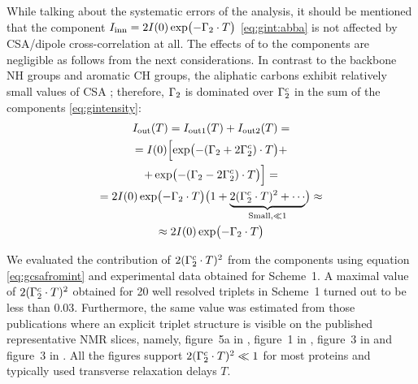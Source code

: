 \documentclass[twocolumn]{svjour3}           %
\begin{document}
While talking about the systematic errors of the analysis, it should be
mentioned that the \qinner{} component 
$I_\textrm{inn}{} = 2I(0)\exp \bigl( -{\Gamma_2 \cdot T\bigr)}$ \eqref{eq:gint:abba} 
is not affected by CSA\slash dipole cross-cor\-re\-la\-tion \gtwoCSA{} 
at all. The effects of \gtwoCSA{} to the \qouter{} components are negligible as follows from the next considerations. 
In contrast to the backbone NH groups and aromatic CH groups, 
the aliphatic carbons exhibit relatively small values of CSA 
\cite{ferrage_chapter_2017,banci_side_2001,zheng_measurement_2004};
therefore, $\Gamma_2$ is dominated over $\Gamma_2^c$
in the sum of the \qouter{} components \eqref{eq:gintensity}: 
\begin{multline}
    \label{eq:neglectCSA}
    I_\textrm{out}(T) = I_\textrm{out1}(T) + I_\textrm{out2}(T) = \\
      = I(0)\Bigl[\exp\bigl({-(\Gamma_2 + 2\Gamma_2^c) \cdot T}\bigr) + \\  
       + \exp\bigl({-(\Gamma_2 - 2\Gamma_2^c) \cdot T} \bigr) \Bigr]= \\
     = 2I(0)\exp\bigl({-\Gamma_2 \cdot T} \bigr) 
             \bigl(1+
               \underbrace{ 2(\Gamma_2^c \cdot T)^2+\cdots}_{\text{Small,}\ll 1}
            \bigr) 
      \approx \\
      \approx 2I(0)\exp \bigl( {-\Gamma_2 \cdot T} \bigr)
\end{multline}

We evaluated the contribution of $2(\Gamma_2^c \cdot T)^2$ 
 from the \qouter{} components using equation \eqref{eq:gcsafromint} and
 experimental data obtained for Scheme~1.
 A maximal value of $2(\Gamma_2^c \cdot T)^2$ obtained for 20 well resolved triplets in Scheme~1 turned out to be less
 than 0.03. Furthermore, the same value was estimated
 from those publications where an explicit \clab{} triplet structure 
 is visible  on the published representative NMR slices, namely, 
 figure~5a in \cite{yang_study_1998}, 
 figure~1 in \cite{yang_1h13c_1999}, 
 figure~3 in \cite{banci_side_2001} and 
 figure~3 in  \cite{zheng_measurement_2004}. All the figures
 support $2(\Gamma_2^c \cdot T)^2 \ll 1$ for most proteins and 
 typically used transverse relaxation delays $T$.
\end{document}
